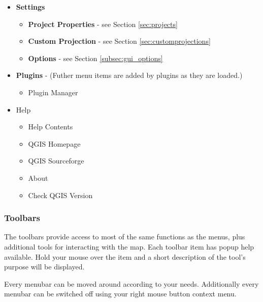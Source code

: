 \begin{itemize}
\item \textbf{Settings}
\begin{itemize}
\item \textbf{Project Properties}  - see Section \ref{sec:projects}
\item \textbf{Custom Projection}   - see Section \ref{sec:customprojections}
\item \textbf{Options}             - see Section \ref{subsec:gui_options}
\end{itemize}

\item \textbf{Plugins} - (Futher menu items are added by plugins as they are loaded.)
\begin{itemize}
\item Plugin Manager
\end{itemize}

\item Help
\begin{itemize}
\item Help Contents
\item QGIS Homepage
\item QGIS Sourceforge
\item About
\item Check QGIS Version

\end{itemize}

\end{itemize}


\subsubsection{Toolbars}\label{label_toolbars}

The toolbars provide access to most of the same functions as the menus,
plus additional tools for interacting with the map. Each toolbar item has
popup help available. Hold your mouse over the item and a short description of
the tool's purpose will be displayed. 

Every menubar can be moved around according to your needs. Additionally every
menubar can be switched off using your right mouse button context menu.

